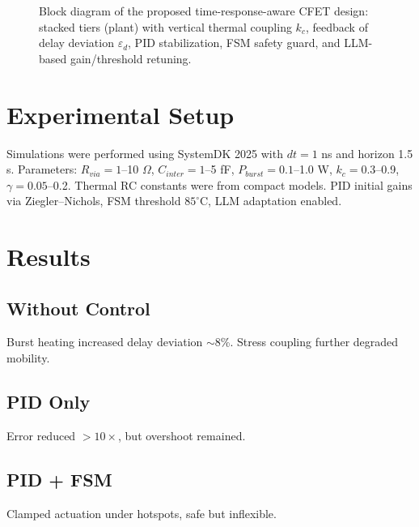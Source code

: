 \documentclass[conference]{IEEEtran}
\begin{document}
\begin{figure}[t]
\caption{Block diagram of the proposed time-response-aware CFET design:
stacked tiers (plant) with vertical thermal coupling $k_c$, feedback of delay deviation $\varepsilon_d$,
PID stabilization, FSM safety guard, and LLM-based gain/threshold retuning.}
\label{fig:model_tikz}
\end{figure}

\section{Experimental Setup}
Simulations were performed using SystemDK 2025 with $dt=1$ ns and horizon 1.5 s. Parameters:  
$R_{via}=1$--10 $\Omega$, $C_{inter}=1$--5 fF, $P_{burst}=0.1$--1.0 W, $k_c=0.3$--0.9, $\gamma=0.05$--0.2.  
Thermal RC constants were from compact models. PID initial gains via Ziegler–Nichols, FSM threshold $85^\circ$C, LLM adaptation enabled.

\section{Results}
\subsection{Without Control}
Burst heating increased delay deviation $\sim$8\%. Stress coupling further degraded mobility.  
\subsection{PID Only}
Error reduced $>10\times$, but overshoot remained.  
\subsection{PID + FSM}
Clamped actuation under hotspots, safe but inflexible.  
\end{document}
